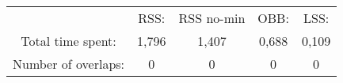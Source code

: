 \begin{tabular}{c|c|c|c|c}\\ 
& RSS: & RSS no-min & OBB: & LSS:\\ 
Total time spent: & 1,796 & 1,407 & 0,688 & 0,109\\ 
Number of overlaps: &0 & 0 & 0 & 0\\ 
\end{tabular}